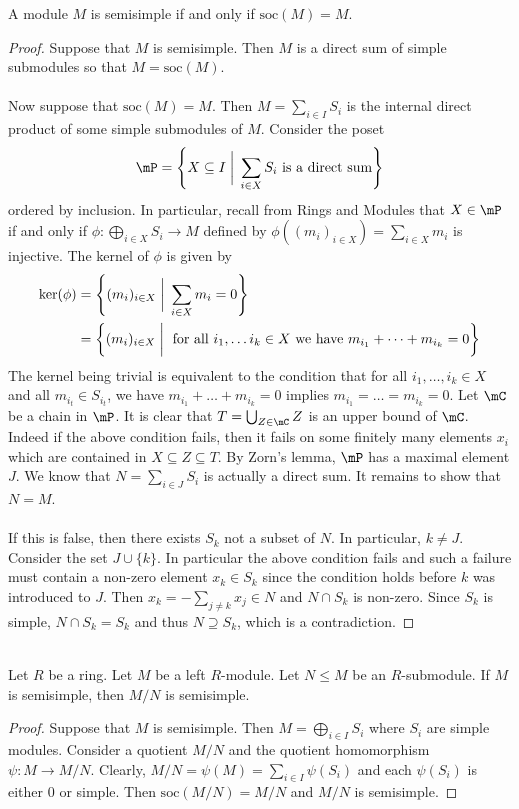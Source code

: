 \documentclass[a4paper]{article}
\begin{document}
\begin{prp}{}{} A module $M$ is semisimple if and only if $\text{soc}(M)=M$. 
\begin{proof}
Suppose that $M$ is semisimple. Then $M$ is a direct sum of simple submodules so that $M=\text{soc}(M)$. \\~\\

Now suppose that $\text{soc}(M)=M$. Then $M=\sum_{i\in I}S_i$ is the internal direct product of some simple submodules of $M$. Consider the poset $$\mP=\left\{X\subseteq I\;\bigg{|}\;\sum_{i\in X}S_i\text{ is a direct sum}\right\}$$ ordered by inclusion. In particular, recall from Rings and Modules that $X\in\mP$ if and only if $\phi:\bigoplus_{i\in X}S_i\to M$ defined by $\phi\left((m_i)_{i\in X}\right)=\sum_{i\in X}m_i$ is injective. The kernel of $\phi$ is given by 
\begin{align*}
\ker(\phi)&=\left\{(m_i)_{i\in X}\;\bigg{|}\;\sum_{i\in X}m_i=0\right\}\\
&=\left\{(m_i)_{i\in X}\;\bigg{|}\;\text{ for all }i_1,\dots i_k\in X\text{ we have }m_{i_1}+\dots+m_{i_k}=0\right\}
\end{align*}
The kernel being trivial is equivalent to the condition that for all $i_1,\dots,i_k\in X$ and all $m_{i_t}\in S_{i_t}$, we have $m_{i_1}+\dots+m_{i_k}=0$ implies $m_{i_1}=\dots=m_{i_k}=0$. Let $\mC$ be a chain in $\mP$. It is clear that $T=\bigcup_{Z\in\mC}Z$ is an upper bound of $\mC$. Indeed if the above condition fails, then it fails on some finitely many elements $x_i$ which are contained in $X\subseteq Z\subseteq T$. By Zorn's lemma, $\mP$ has a maximal element $J$. We know that $N=\sum_{i\in J}S_i$ is actually a direct sum. It remains to show that $N=M$. \\~\\

If this is false, then there exists $S_k$ not a subset of $N$. In particular, $k\neq J$. Consider the set $J\cup\{k\}$. In particular the above condition fails and such a failure must contain a non-zero element $x_k\in S_k$ since the condition holds before $k$ was introduced to $J$. Then $x_k=-\sum_{j\neq k}x_j\in N$ and $N\cap S_k$ is non-zero. Since $S_k$ is simple, $N\cap S_k=S_k$ and thus $N\supseteq S_k$, which is a contradiction. 
\end{proof}
\end{prp}

\begin{crl}{}{}\\
Let $R$ be a ring. Let $M$ be a left $R$-module. Let $N\leq M$ be an $R$-submodule. If $M$ is semisimple, then $M/N$ is semisimple. 
\begin{proof}
Suppose that $M$ is semisimple. Then $M=\bigoplus_{i\in I}S_i$ where $S_i$ are simple modules. Consider a quotient $M/N$ and the quotient homomorphism $\psi:M\to M/N$. Clearly, $M/N=\psi(M)=\sum_{i\in I}\psi(S_i)$ and each $\psi(S_i)$ is either $0$ or simple. Then $\text{soc}(M/N)=M/N$ and $M/N$ is semisimple. 
\end{proof}
\end{crl}
\end{document}
